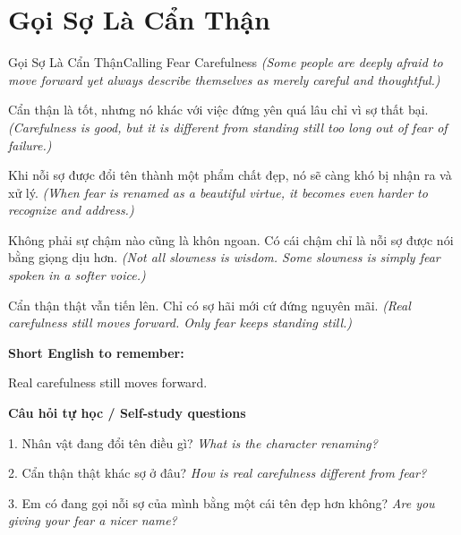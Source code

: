 \section{Gọi Sợ Là Cẩn Thận}
\begin{truyen}{Gọi Sợ Là Cẩn Thận}{Calling Fear Carefulness}
\textit{(Some people are deeply afraid to move forward yet always describe themselves as merely careful and thoughtful.)}

Cẩn thận là tốt, nhưng nó khác với việc đứng yên quá lâu chỉ vì sợ thất bại.
\textit{(Carefulness is good, but it is different from standing still too long out of fear of failure.)}

Khi nỗi sợ được đổi tên thành một phẩm chất đẹp, nó sẽ càng khó bị nhận ra và xử lý.
\textit{(When fear is renamed as a beautiful virtue, it becomes even harder to recognize and address.)}

Không phải sự chậm nào cũng là khôn ngoan. Có cái chậm chỉ là nỗi sợ được nói bằng giọng dịu hơn.
\textit{(Not all slowness is wisdom. Some slowness is simply fear spoken in a softer voice.)}

\end{truyen}

\begin{baihoc}
Cẩn thận thật vẫn tiến lên. Chỉ có sợ hãi mới cứ đứng nguyên mãi.
\textit{(Real carefulness still moves forward. Only fear keeps standing still.)}
\end{baihoc}

\begin{ghinhoanh}
\textbf{Short English to remember:}

Real carefulness still moves forward.

\end{ghinhoanh}

\begin{tuhocnhanh}
\textbf{Câu hỏi tự học / Self-study questions}

1. Nhân vật đang đổi tên điều gì? \textit{What is the character renaming?}

2. Cẩn thận thật khác sợ ở đâu? \textit{How is real carefulness different from fear?}

3. Em có đang gọi nỗi sợ của mình bằng một cái tên đẹp hơn không? \textit{Are you giving your fear a nicer name?}
\end{tuhocnhanh}
\ngancach

